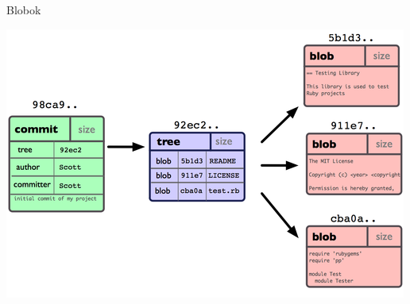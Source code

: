 
\begin{frame}{Blobok}
    \begin{center}
        \includegraphics{frames/diagrams/blobs.png}
    \end{center}
\end{frame}

